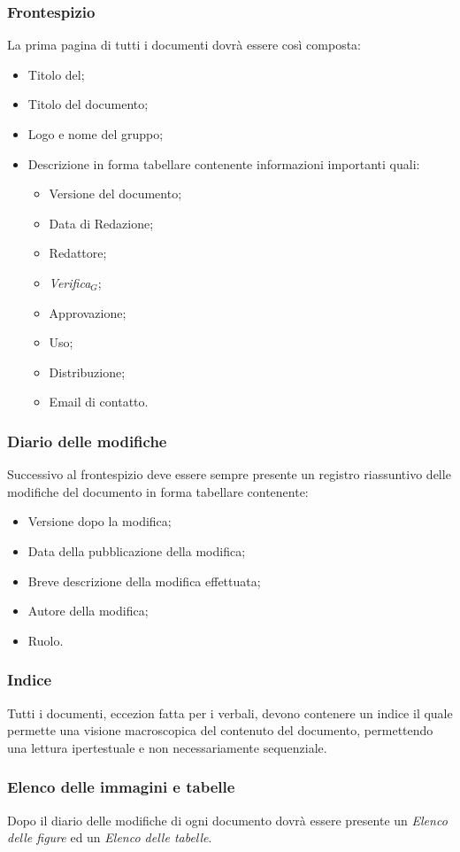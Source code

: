 \subsubsection{Frontespizio}
La prima pagina di tutti i documenti dovrà essere così composta:
\begin{itemize}
	\item Titolo del;
	\item Titolo del documento;
	\item Logo e nome del gruppo;
	\item Descrizione in forma tabellare contenente informazioni importanti quali:
	\begin{itemize}
		\item Versione del documento;
		\item Data di Redazione;
		\item Redattore;
		\item \textit{Verifica$_{G}$};
		\item Approvazione;
		\item Uso;
		\item Distribuzione;
		\item Email di contatto.
	\end{itemize}
\end{itemize}

\subsubsection{Diario delle modifiche}
Successivo al frontespizio deve essere sempre presente un registro riassuntivo delle modifiche del documento in forma tabellare contenente:
\begin{itemize}
\item Versione dopo la modifica;
\item Data della pubblicazione della modifica;
\item Breve descrizione della modifica effettuata;
\item Autore della modifica;
\item Ruolo.
\end{itemize}
\subsubsection{Indice}
Tutti i documenti, eccezion fatta per i verbali, devono contenere un indice il quale permette una visione macroscopica del contenuto del documento,
permettendo una lettura ipertestuale e non necessariamente sequenziale.
 \subsubsection{Elenco delle immagini e tabelle} 
Dopo il diario delle modifiche di ogni documento dovrà essere presente un \textit{Elenco delle figure} ed un \textit{Elenco delle tabelle}.

